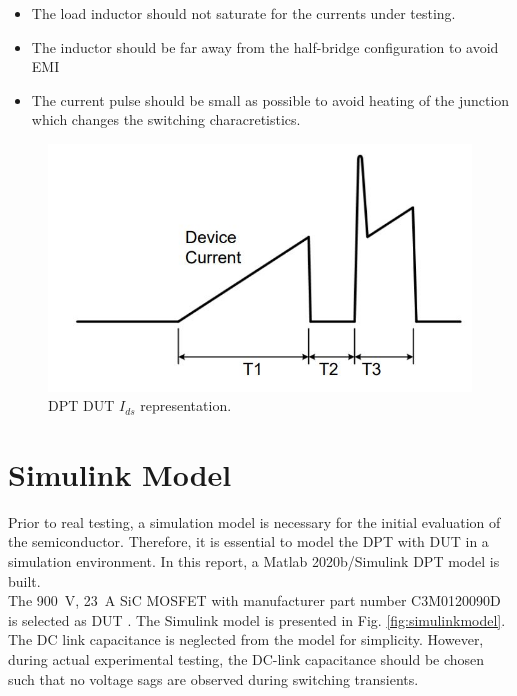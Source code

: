 \documentclass[12pt]{article} %
\begin{document}
\begin{itemize}
    \item The load inductor should not saturate for the currents under testing.
    \item The inductor should be far away from the half-bridge configuration to avoid EMI
    \item The current pulse should be small as possible to avoid heating of the junction which changes the switching characretistics.
\end{itemize}



\begin{figure}[h!]
	\includegraphics[scale=0.7]{figures/DPT_timing.JPG}
	\caption{DPT DUT $I_{ds}$ representation.}
	\label{fig:DPTtiming}
\end{figure}

\section{Simulink Model}

Prior to real testing, a simulation model is necessary for the initial evaluation of the semiconductor. Therefore, it is essential to model the DPT with DUT in a simulation environment. In this report, a Matlab 2020b/Simulink DPT model is built.\\

The 900~V, 23~A SiC MOSFET with manufacturer part number C3M0120090D is selected as DUT \cite{Cree}. The Simulink model is presented in Fig. \ref{fig:simulinkmodel}. The DC link capacitance is neglected from the model for simplicity. However, during actual experimental testing, the DC-link capacitance should be chosen such that no voltage sags are observed during switching transients. 
\end{document}

